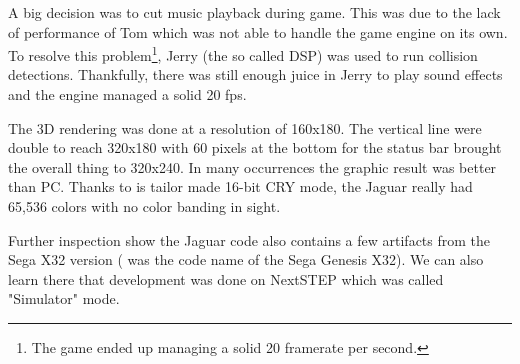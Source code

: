 \par
{}
\par
A big decision was to cut music playback during game. This was due to the lack of performance of Tom which was not able to handle the game engine on its own. To resolve this problem\footnote{The game ended up managing a solid 20 framerate per second.}, Jerry (the so called DSP) was used to run collision detections. Thankfully, there was still enough juice in Jerry to play sound effects and the engine managed a solid 20 fps.\\
\par
The 3D rendering was done at a resolution of 160x180. The vertical line were double to reach 320x180 with 60 pixels at the bottom for the status bar brought the overall thing to 320x240. In many occurrences the graphic result was better than PC. Thanks to is tailor made 16-bit CRY mode, the Jaguar really had 65,536 colors with no color banding in sight.\\
\par
{}
\par
Further inspection show the Jaguar code also contains a few artifacts from the Sega X32 version ( was the code name of the Sega Genesis X32). We can also learn there that development was done on NextSTEP which was called "Simulator" mode.\\
\par
{}
\par


